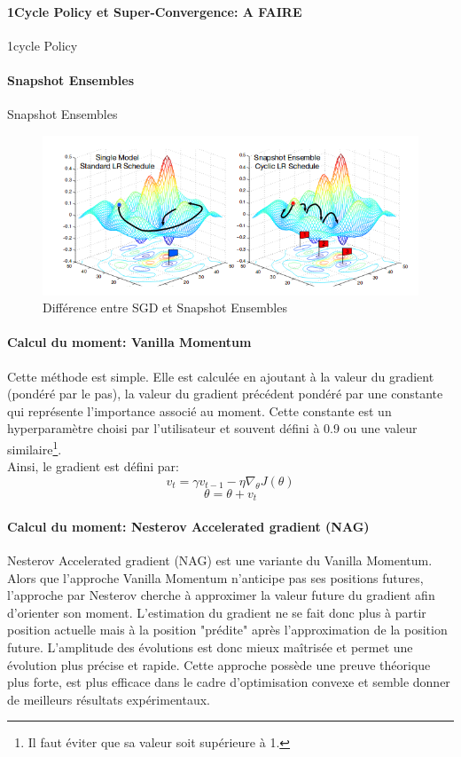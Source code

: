 \paragraph{1Cycle Policy et Super-Convergence: A FAIRE}
1cycle Policy\cite{1cyclelr}

\paragraph{Snapshot Ensembles}
\noindent Snapshot Ensembles\cite{snapshot}

\begin{figure}
    \centering
    \includegraphics[scale=0.3]{./tex/fondamentaux/snapshot.png}
    \caption{Différence entre SGD et Snapshot Ensembles}
    \label{snapshot}
\end{figure}

\paragraph{Calcul du moment: Vanilla Momentum}
\noindent Cette méthode est simple. Elle est calculée en ajoutant à la valeur du gradient (pondéré par le pas), la valeur du gradient précédent pondéré par une constante qui représente l'importance associé au moment. Cette constante est un hyperparamètre choisi par l'utilisateur et souvent défini à 0.9 ou une valeur similaire\footnote{Il faut éviter que sa valeur soit supérieure à 1.}.\\

\noindent Ainsi, le gradient est défini par:
$$v_t = \gamma v_{t-1} - \eta \nabla_\theta J( \theta)$$
$$\theta = \theta + v_t $$

\paragraph{Calcul du moment: Nesterov Accelerated gradient (NAG)}
\noindent Nesterov Accelerated gradient\cite{nesterov} (NAG) est une variante du Vanilla Momentum. Alors que l'approche Vanilla Momentum n'anticipe pas ses positions futures, l'approche par Nesterov cherche à approximer la valeur future du gradient afin d'orienter son moment. L'estimation du gradient ne se fait donc plus à partir position actuelle mais à la position "prédite" après l'approximation de la position future. L'amplitude des évolutions est donc mieux maîtrisée et permet une évolution plus précise et rapide. Cette approche possède une preuve théorique plus forte, est plus efficace dans le cadre d'optimisation convexe et semble donner de meilleurs résultats expérimentaux.\\

